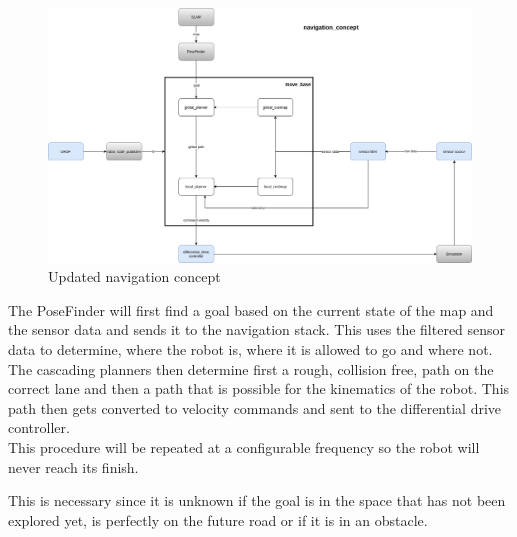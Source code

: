 \begin{figure}[H]
	\begin{center}
		\includegraphics[width=140mm]{Pictures/Updated navigation concept}
		\caption[updated navigation concept]{Updated navigation concept}
	\end{center}
\end{figure}



The PoseFinder will first find a goal based on the current state of the map and the sensor data and sends it to the navigation stack. This uses the filtered sensor data to determine, where the robot is, where it is allowed to go and where not. The cascading planners then determine first a rough, collision free, path on the correct lane and then a path that is possible for the kinematics of the robot. This path then gets converted to velocity commands and sent to the differential drive controller.\\
This procedure will be repeated at a configurable frequency so the robot will never reach its finish. 

This is necessary since it is unknown if the goal is in the space that has not been explored yet, is perfectly on the future road or if it is in an obstacle.




